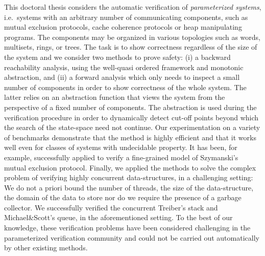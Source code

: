 
This doctoral thesis considers the automatic verification of
\emph{parameterized systems}, i.e.\ systems with an arbitrary number
of communicating components, such as mutual exclusion protocols, cache
coherence protocols or heap manipulating programs. %
The components may be organized in various topologies such as words,
multisets, rings, or trees.
%
The task is to show correctness regardless of the size of the system
and we consider two methods to prove safety:
(i) a backward reachability analysis, using the well-quasi ordered
framework and monotonic abstraction, and
(ii) a forward analysis which only needs to inspect a small number of
components in order to show correctness of the whole system. The
latter relies on an abstraction function that views the system from
the perspective of a fixed number of components. The abstraction is
used during the verification procedure in order to dynamically detect
cut-off points beyond which the search of the state-space need not
continue.
% 
Our experimentation on a variety of benchmarks demonstrate that the
method is highly efficient and that it works well even for classes of
systems with undecidable property.
It has been, for example, successfully applied to verify a
fine-grained model of Szymanski's mutual exclusion protocol.
Finally, we applied the methods to solve the complex problem of
verifying highly concurrent data-structures, in a challenging setting:
We do not a priori bound the number of threads, the size of the
data-structure, the domain of the data to store nor do we require the
presence of a garbage collector.
We successfully verified the concurrent Treiber's stack and
Michael\&Scott's queue, in the aforementioned setting.
%
To the best of our knowledge, these verification problems have been
considered challenging in the parameterized verification community and
could not be carried out automatically by other existing methods.
